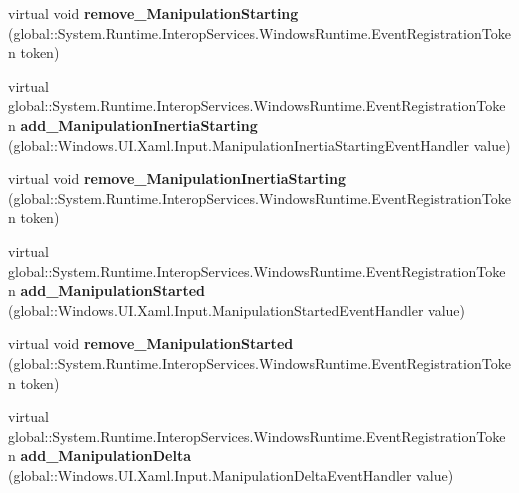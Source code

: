 \begin{DoxyCompactItemize}
\mbox{\label{class_windows_1_1_u_i_1_1_xaml_1_1_u_i_element_a6b3fdc2deaa4b4844b6f70ba634a074e}} 
virtual void {\bfseries remove\+\_\+\+Manipulation\+Starting} (global\+::\+System.\+Runtime.\+Interop\+Services.\+Windows\+Runtime.\+Event\+Registration\+Token token)
\item 
\mbox{\label{class_windows_1_1_u_i_1_1_xaml_1_1_u_i_element_a720897f9e46f85c8b896d40d415419c3}} 
virtual global\+::\+System.\+Runtime.\+Interop\+Services.\+Windows\+Runtime.\+Event\+Registration\+Token {\bfseries add\+\_\+\+Manipulation\+Inertia\+Starting} (global\+::\+Windows.\+U\+I.\+Xaml.\+Input.\+Manipulation\+Inertia\+Starting\+Event\+Handler value)
\item 
\mbox{\label{class_windows_1_1_u_i_1_1_xaml_1_1_u_i_element_a70d5f221b113c0f94830ff04ba95e077}} 
virtual void {\bfseries remove\+\_\+\+Manipulation\+Inertia\+Starting} (global\+::\+System.\+Runtime.\+Interop\+Services.\+Windows\+Runtime.\+Event\+Registration\+Token token)
\item 
\mbox{\label{class_windows_1_1_u_i_1_1_xaml_1_1_u_i_element_a267e7d9d4c83d6c6a025e11165660ad9}} 
virtual global\+::\+System.\+Runtime.\+Interop\+Services.\+Windows\+Runtime.\+Event\+Registration\+Token {\bfseries add\+\_\+\+Manipulation\+Started} (global\+::\+Windows.\+U\+I.\+Xaml.\+Input.\+Manipulation\+Started\+Event\+Handler value)
\item 
\mbox{\label{class_windows_1_1_u_i_1_1_xaml_1_1_u_i_element_af6ad67fc431c2034b4431d6cf4776b22}} 
virtual void {\bfseries remove\+\_\+\+Manipulation\+Started} (global\+::\+System.\+Runtime.\+Interop\+Services.\+Windows\+Runtime.\+Event\+Registration\+Token token)
\item 
\mbox{\label{class_windows_1_1_u_i_1_1_xaml_1_1_u_i_element_ac039d3e48cf74001e79d9a00893c2fb0}} 
virtual global\+::\+System.\+Runtime.\+Interop\+Services.\+Windows\+Runtime.\+Event\+Registration\+Token {\bfseries add\+\_\+\+Manipulation\+Delta} (global\+::\+Windows.\+U\+I.\+Xaml.\+Input.\+Manipulation\+Delta\+Event\+Handler value)

\end{DoxyCompactItemize}
